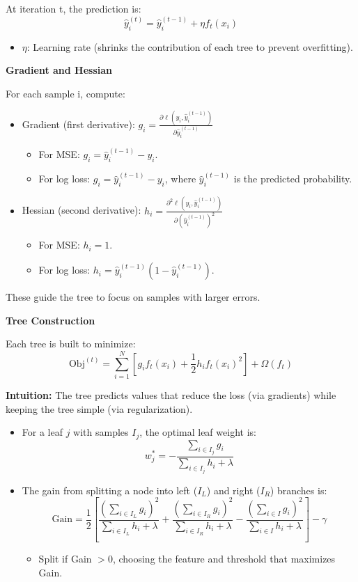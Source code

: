 At iteration t, the prediction is:
\[
    \hat{y}_i^{(t)} = \hat{y}_i^{(t-1)} + \eta f_t(x_i)
\]

\begin{itemize}
    \item $\eta$: Learning rate (shrinks the contribution of each tree to prevent overfitting).
\end{itemize}

\smallskip
\textbf{Gradient and Hessian}

For each sample i, compute:
\begin{itemize}
    \item Gradient (first derivative): $g_i = \frac{\partial \ell(y_i, \hat{y}_i^{(t-1)})}{\partial \hat{y}_i^{(t-1)}}$
    \begin{itemize}
        \item For MSE: $g_i = \hat{y}_i^{(t-1)} - y_i$.
        \item For log loss: $g_i = \hat{y}_i^{(t-1)} - y_i$, where $\hat{y}_i^{(t-1)}$ is the predicted probability.
    \end{itemize}
    \medskip
    \item Hessian (second derivative): $h_i = \frac{\partial^2 \ell(y_i, \hat{y}_i^{(t-1)})}{\partial (\hat{y}_i^{(t-1)})^2}$
    \begin{itemize}
        \item For MSE: $h_i = 1$.
        \item For log loss: $h_i = \hat{y}_i^{(t-1)} (1 - \hat{y}_i^{(t-1)})$.
    \end{itemize}
\end{itemize}

These guide the tree to focus on samples with larger errors.

\textbf{Tree Construction}

Each tree is built to minimize:
\[
    \text{Obj}^{(t)} = \sum_{i=1}^N [g_i f_t(x_i) + \frac{1}{2} h_i f_t(x_i)^2] + \Omega(f_t)
\]

\textbf{Intuition:} The tree predicts values that reduce the loss (via gradients) while keeping the tree simple (via regularization).

\begin{itemize}
    \item For a leaf $j$ with samples $I_j$, the optimal leaf weight is:
    \[
        w_j^* = -\frac{\sum_{i \in I_j} g_i}{\sum_{i \in I_j} h_i + \lambda}
    \]

    \item The gain from splitting a node into left ($I_L$) and right ($I_R$) branches is:
    \[
        \text{Gain} = \frac{1}{2} \left[ \frac{(\sum_{i \in I_L} g_i)^2}{\sum_{i \in I_L} h_i + \lambda} + \frac{(\sum_{i \in I_R} g_i)^2}{\sum_{i \in I_R} h_i + \lambda} - \frac{(\sum_{i \in I} g_i)^2}{\sum_{i \in I} h_i + \lambda} \right] - \gamma
    \]
    \begin{itemize}
        \item Split if Gain $> 0$, choosing the feature and threshold that maximizes Gain.
    \end{itemize}
\end{itemize}

